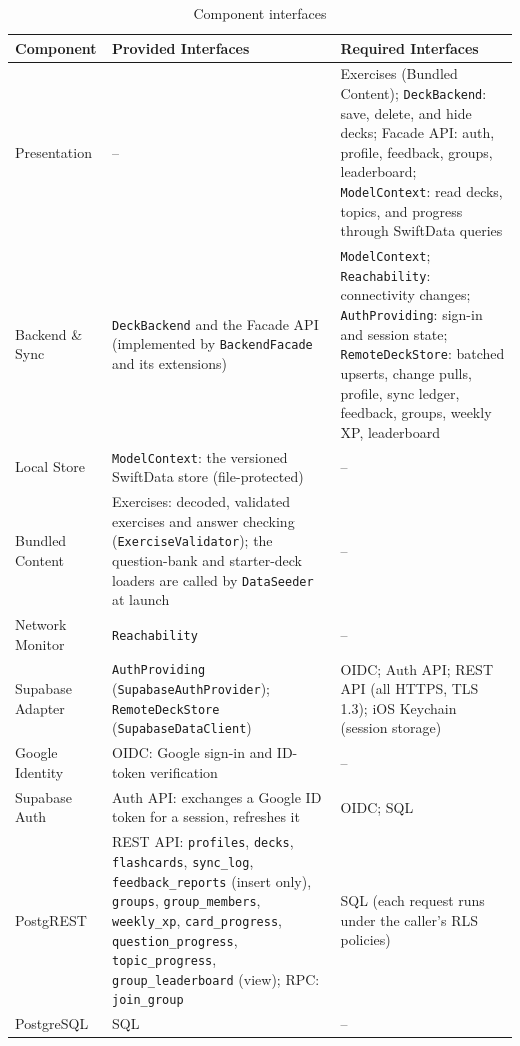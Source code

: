 \documentclass[12pt,letterpaper]{article}
\begin{document}
\begin{table}[H]
\centering
\caption{Component interfaces}
\label{tab:interfaces}
\begin{tabularx}{\textwidth}{@{}L{2.8cm} Y Y@{}}
\toprule
\textbf{Component} & \textbf{Provided Interfaces} & \textbf{Required Interfaces} \\
\midrule
Presentation & -- & Exercises (Bundled Content); \texttt{DeckBackend}: save, delete, and hide decks; Facade API: auth, profile, feedback, groups, leaderboard; \texttt{ModelContext}: read decks, topics, and progress through SwiftData queries \\
Backend \& Sync & \texttt{DeckBackend} and the Facade API (implemented by \texttt{BackendFacade} and its extensions) & \texttt{ModelContext}; \texttt{Reachability}: connectivity changes; \texttt{AuthProviding}: sign-in and session state; \texttt{RemoteDeckStore}: batched upserts, change pulls, profile, sync ledger, feedback, groups, weekly XP, leaderboard \\
Local Store & \texttt{ModelContext}: the versioned SwiftData store (file-protected) & -- \\
Bundled Content & Exercises: decoded, validated exercises and answer checking (\texttt{ExerciseValidator}); the question-bank and starter-deck loaders are called by \texttt{DataSeeder} at launch & -- \\
Network Monitor & \texttt{Reachability} & -- \\
Supabase Adapter & \texttt{AuthProviding} (\texttt{SupabaseAuthProvider}); \texttt{RemoteDeckStore} (\texttt{SupabaseDataClient}) & OIDC; Auth API; REST API (all HTTPS, TLS 1.3); iOS Keychain (session storage) \\
Google Identity & OIDC: Google sign-in and ID-token verification & -- \\
Supabase Auth & Auth API: exchanges a Google ID token for a session, refreshes it & OIDC; SQL \\
PostgREST & REST API: \texttt{profiles}, \texttt{decks}, \texttt{flashcards}, \texttt{sync\_log}, \texttt{feedback\_reports} (insert only), \texttt{groups}, \texttt{group\_members}, \texttt{weekly\_xp}, \texttt{card\_progress}, \texttt{question\_progress}, \texttt{topic\_progress}, \texttt{group\_leaderboard} (view); RPC: \texttt{join\_group} & SQL (each request runs under the caller's RLS policies) \\
PostgreSQL & SQL & -- \\
\bottomrule
\end{tabularx}
\end{table}
\end{document}
